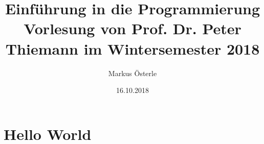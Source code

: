 \documentclass[titlepage,11pt,a4paper,ngerman]{report}
\begin{document}
	

\title{
	{\Huge Einführung in die Programmierung}\\[1em]
	{\Large Vorlesung von Prof. Dr. Peter Thiemann im Wintersemester 2018}}
\author{Markus Österle} %
\date{16.10.2018}
\maketitle
\tableofcontents

\chapter{Hello World}




%
%
\end{document}
